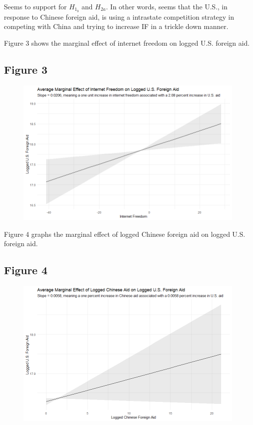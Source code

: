 \documentclass[12pt]{article}
\begin{document}
\pagebreak
Seems to support for $H_{1_b}$ and $H_{2a}$. In other words, seems that the U.S., in response to Chinese foreign aid, is using a intrastate competition strategy in competing with China and trying to increase IF in a trickle down manner.

\pagebreak
Figure 3 shows the marginal effect of internet freedom on logged U.S. foreign aid.

\subsection*{Figure 3}
\begin{figure}[htbp]
    \includegraphics[scale=0.7]{628plot1.png}
\end{figure}

\pagebreak
Figure 4 graphs the marginal effect of logged Chinese foreign aid on logged U.S. foreign aid.

\subsection*{Figure 4}
\begin{figure}[htbp]
    \includegraphics[scale=0.7]{628plot2.png}
\end{figure}
\pagebreak 
\end{document}

